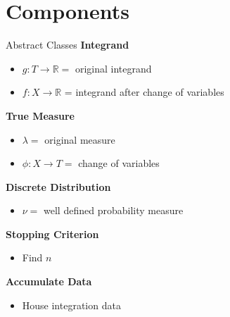 \documentclass[11pt]{beamer}
\begin{document}
\section{Components}
\begin{frame}{Abstract Classes}
    \textbf{Integrand}
        \begin{itemize}
            \item $ g:T \rightarrow \mathbb{R} = $ original integrand
            \item $f: X \rightarrow \mathbb{R} $ = integrand after change of variables
        \end{itemize}
    \textbf{True Measure}
        \begin{itemize}
            \item $\lambda = $ original measure
            \item $\phi: X \rightarrow T = $ change of variables
        \end{itemize}
    \textbf{Discrete Distribution}
        \begin{itemize}
            \item $\nu = $ well defined probability measure
        \end{itemize}
    \textbf{Stopping Criterion}
        \begin{itemize}
            \item Find $n$
        \end{itemize}
    \textbf{Accumulate Data}
        \begin{itemize}
            \item House integration data
        \end{itemize}
\end{frame}
\end{document}

